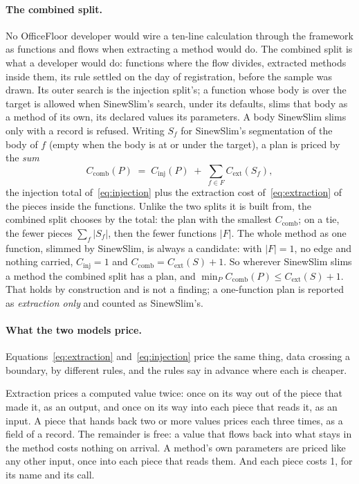 \documentclass[11pt,a4paper]{article}
\begin{document}
\paragraph{The combined split.} No OfficeFloor developer would wire a
ten-line calculation through the framework as functions and flows when
extracting a method would do. The combined split is what a developer would
do: functions where the flow divides, extracted methods inside them, its
rule settled on the day of registration, before the sample was drawn. Its
outer search is the injection split's; a function whose body is over the
target is allowed when SinewSlim's search, under its defaults, slims that
body as a method of its own, its declared values its parameters. A body
SinewSlim slims only with a record is refused. Writing $S_f$ for SinewSlim's
segmentation of the body of $f$ (empty when the body is at or under the
target), a plan is priced by the \emph{sum}
\begin{equation}\label{eq:combined}
  C_{\mathrm{comb}}(P) \;=\; C_{\mathrm{inj}}(P) \;+\; \sum_{f \in F} C_{\mathrm{ext}}(S_f),
\end{equation}
the injection total of~\eqref{eq:injection} plus the extraction cost
of~\eqref{eq:extraction} of the pieces inside the functions. Unlike the two
splits it is built from, the combined split chooses by the total: the plan
with the smallest $C_{\mathrm{comb}}$; on a tie, the fewer pieces
$\sum_f |S_f|$, then the fewer functions $|F|$. The whole method as one
function, slimmed by SinewSlim, is always a candidate: with $|F| = 1$, no
edge and nothing carried, $C_{\mathrm{inj}} = 1$ and
$C_{\mathrm{comb}} = C_{\mathrm{ext}}(S) + 1$. So wherever SinewSlim slims a
method the combined split has a plan, and
$\min_P C_{\mathrm{comb}}(P) \le C_{\mathrm{ext}}(S) + 1$. That holds by
construction and is not a finding; a one-function plan is reported as
\emph{extraction only} and counted as SinewSlim's.

\paragraph{What the two models price.} Equations~\eqref{eq:extraction}
and~\eqref{eq:injection} price the same thing, data crossing a boundary, by
different rules, and the rules say in advance where each is cheaper.

Extraction prices a computed value twice: once on its way out of the piece
that made it, as an output, and once on its way into each piece that reads
it, as an input. A piece that hands back two or more values prices each
three times, as a field of a record. The remainder is free: a value that
flows back into what stays in the method costs nothing on arrival. A
method's own parameters are priced like any other input, once into each
piece that reads them. And each piece costs 1, for its name and its call.
\end{document}
